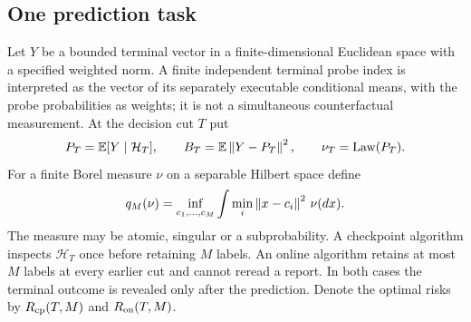 \subsection{One prediction task}
Let $Y$ be a bounded terminal vector in a finite-dimensional Euclidean space with a specified weighted norm. A finite independent terminal probe index is interpreted as the vector of its separately executable conditional means, with the probe probabilities as weights; it is not a simultaneous counterfactual measurement. At the decision cut $T$ put
\begin{equation}\label{eq:task}
 P_T=\mathbb E[Y\mid\mathcal H_T],\qquad B_T=\mathbb E\left\lVert Y-P_T\right\rVert^2,
 \qquad \nu_T=\operatorname{Law}(P_T).
\end{equation}
For a finite Borel measure $\nu$ on a separable Hilbert space define
\begin{equation}\label{eq:quantization}
 q_M(\nu)=\inf_{c_1,\ldots,c_M}\int\min_i\left\lVert x-c_i\right\rVert^2\,\nu(dx).
\end{equation}
The measure may be atomic, singular or a subprobability. A checkpoint algorithm inspects $\mathcal H_T$ once before retaining $M$ labels. An online algorithm retains at most $M$ labels at every earlier cut and cannot reread a report. In both cases the terminal outcome is revealed only after the prediction. Denote the optimal risks by $R_{\mathrm{cp}}(T,M)$ and $R_{\mathrm{on}}(T,M)$.
